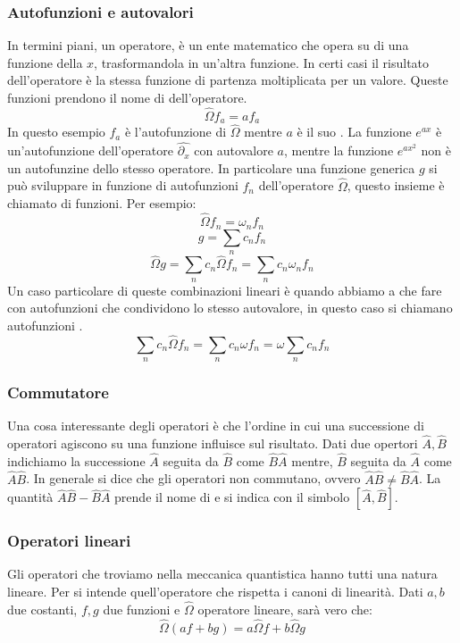 \subsubsection{Autofunzioni e autovalori}
In termini piani, un operatore, è un ente matematico che opera su di una funzione della $x$, trasformandola in un'altra funzione. In certi casi il risultato dell'operatore è la stessa funzione di partenza moltiplicata per un valore. Queste funzioni prendono il nome di  dell'operatore.
$$\hat{\Omega} f_a = a f_a$$
In questo esempio $f_a$ è l'autofunzione di $\hat{\Omega}$ mentre $a$ è il suo . La funzione $e^{ax}$ è un'autofunzione dell'operatore $\hat{\partial{}_x}$ con autovalore $a$, mentre la funzione $e^{ax^2}$ non è un autofunzine dello stesso operatore. In particolare una funzione generica $g$ si può sviluppare in funzione di autofunzioni $f_n$ dell'operatore $\hat{\Omega}$, questo insieme è chiamato  di funzioni. Per esempio:
$$\hat{\Omega} f_n = \omega_n f_n$$
$$g = \sum_n c_n f_n$$
$$\hat{\Omega} g = \sum_n c_n \hat{\Omega} f_n = \sum_n c_n \omega_n f_n$$
Un caso particolare di queste combinazioni lineari è quando abbiamo a che fare con autofunzioni che condividono lo stesso autovalore, in questo caso si chiamano autofunzioni .
$$\sum_n c_n \hat{\Omega} f_n = \sum_n c_n \omega f_n = \omega \sum_n c_n f_n$$

\subsubsection{Commutatore}
Una cosa interessante degli operatori è che l'ordine in cui una successione di operatori agiscono su una funzione influisce sul risultato. Dati due opertori $\hat{A}, \hat{B}$ indichiamo la successione $\hat{A}$ seguita da $\hat{B}$ come $\hat{B}\hat{A}$ mentre, $\hat{B}$ seguita da $\hat{A}$ come $\hat{A}\hat{B}$.
In generale si dice che gli operatori non commutano, ovvero $\hat{A}\hat{B} \ne \hat{B}\hat{A}$. La quantità $\hat{A}\hat{B} - \hat{B}\hat{A}$ prende il nome di  e si indica con il simbolo $[\hat{A},\hat{B}]$.

\subsubsection{Operatori lineari}
Gli operatori che troviamo nella meccanica quantistica hanno tutti una natura lineare. Per  si intende quell'operatore che rispetta i canoni di linearità. Dati $a, b$ due costanti, $f, g$ due funzioni e $\hat{\Omega}$ operatore lineare, sarà vero che:
$$\hat{\Omega}( af + bg ) = a \hat{\Omega} f + b \hat{\Omega} g$$

